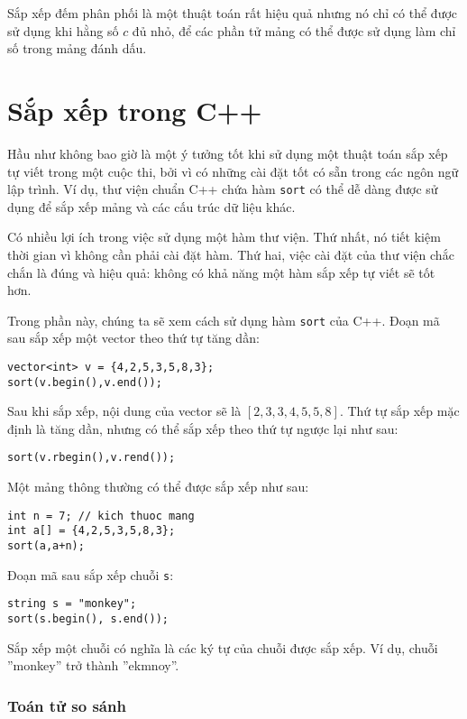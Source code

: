 Sắp xếp đếm phân phối là một thuật toán rất hiệu quả
nhưng nó chỉ có thể được sử dụng khi hằng số $c$
đủ nhỏ, để các phần tử mảng có thể
được sử dụng làm chỉ số trong mảng đánh dấu.

\section{Sắp xếp trong C++}


Hầu như không bao giờ là một ý tưởng tốt khi sử dụng
một thuật toán sắp xếp tự viết
trong một cuộc thi, bởi vì có những
cài đặt tốt có sẵn trong các ngôn ngữ lập trình.
Ví dụ, thư viện chuẩn C++ chứa
hàm \texttt{sort} có thể dễ dàng được sử dụng để
sắp xếp mảng và các cấu trúc dữ liệu khác.

Có nhiều lợi ích trong việc sử dụng một hàm thư viện.
Thứ nhất, nó tiết kiệm thời gian vì không cần phải
cài đặt hàm.
Thứ hai, việc cài đặt của thư viện
chắc chắn là đúng và hiệu quả: không có khả năng
một hàm sắp xếp tự viết sẽ tốt hơn.

Trong phần này, chúng ta sẽ xem cách sử dụng
hàm \texttt{sort} của C++.
Đoạn mã sau sắp xếp
một vector theo thứ tự tăng dần:
\begin{lstlisting}
vector<int> v = {4,2,5,3,5,8,3};
sort(v.begin(),v.end());
\end{lstlisting}
Sau khi sắp xếp, nội dung của
vector sẽ là
$[2,3,3,4,5,5,8]$.
Thứ tự sắp xếp mặc định là tăng dần,
nhưng có thể sắp xếp theo thứ tự ngược lại như sau:
\begin{lstlisting}
sort(v.rbegin(),v.rend());
\end{lstlisting}
Một mảng thông thường có thể được sắp xếp như sau:
\begin{lstlisting}
int n = 7; // kich thuoc mang
int a[] = {4,2,5,3,5,8,3};
sort(a,a+n);
\end{lstlisting}
Đoạn mã sau sắp xếp chuỗi \texttt{s}:
\begin{lstlisting}
string s = "monkey";
sort(s.begin(), s.end());
\end{lstlisting}
Sắp xếp một chuỗi có nghĩa là các ký tự
của chuỗi được sắp xếp.
Ví dụ, chuỗi ''monkey'' trở thành ''ekmnoy''.

\subsubsection{Toán tử so sánh}


